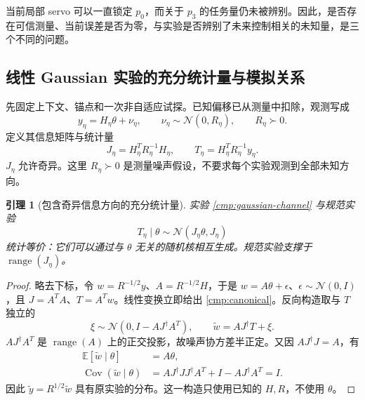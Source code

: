 \documentclass[11pt,a4paper]{article}
\numberwithin{equation}{section}
\newtheorem{lemma}[theorem]{引理}
\theoremstyle{definition}
\DeclareMathOperator{\Cov}{Cov}
\newcommand{\E}{\mathbb E}
\begin{document}
当前局部 servo 可以一直锁定 $p_0$，而关于 $p_3$ 的任务量仍未被辨别。因此，是否存在可信测量、当前误差是否为零，与实验是否辨别了未来控制相关的未知量，是三个不同的问题。

\subsection{线性 Gaussian 实验的充分统计量与模拟关系}
\label{cmp:gaussian}

先固定上下文、锚点和一次非自适应试探。已知偏移已从测量中扣除，观测写成
\begin{equation}
 y_\eta=H_\eta\theta+\nu_\eta,
 \qquad \nu_\eta\sim\mathcal N(0,R_\eta),\qquad R_\eta\succ0.
 \label{cmp:gaussian-channel}
\end{equation}
定义其信息矩阵与统计量
\begin{equation}
 J_\eta=H_\eta^TR_\eta^{-1}H_\eta,
 \qquad T_\eta=H_\eta^TR_\eta^{-1}y_\eta.
 \label{cmp:information}
\end{equation}
$J_\eta$ 允许奇异。这里 $R_\eta\succ0$ 是测量噪声假设，不要求每个实验观测到全部未知方向。

\begin{lemma}[包含奇异信息方向的充分统计量]
\label{cmp:sufficient}
实验 \eqref{cmp:gaussian-channel} 与规范实验
\begin{equation}
 T_\eta\mid\theta\sim\mathcal N(J_\eta\theta,J_\eta)
 \label{cmp:canonical}
\end{equation}
统计等价：它们可以通过与 $\theta$ 无关的随机核相互生成。规范实验支撑于 $\operatorname{range}(J_\eta)$。
\end{lemma}
\begin{proof}
略去下标，令 $w=R^{-1/2}y$、$A=R^{-1/2}H$，于是 $w=A\theta+\epsilon$、$\epsilon\sim\mathcal N(0,I)$，且 $J=A^TA$、$T=A^Tw$。线性变换立即给出 \eqref{cmp:canonical}。反向构造取与 $T$ 独立的
\begin{equation}
 \xi\sim\mathcal N(0,I-AJ^\dagger A^T),\qquad
 \widetilde w=AJ^\dagger T+\xi.
\end{equation}
$AJ^\dagger A^T$ 是 $\operatorname{range}(A)$ 上的正交投影，故噪声协方差半正定。又因 $AJ^\dagger J=A$，有
\begin{align}
 \E[\widetilde w\mid\theta]&=A\theta,\\
 \Cov(\widetilde w\mid\theta)
 &=AJ^\dagger JJ^\dagger A^T+I-AJ^\dagger A^T=I.
\end{align}
因此 $\widetilde y=R^{1/2}\widetilde w$ 具有原实验的分布。这一构造只使用已知的 $H,R$，不使用 $\theta$。
\end{proof}
\end{document}
